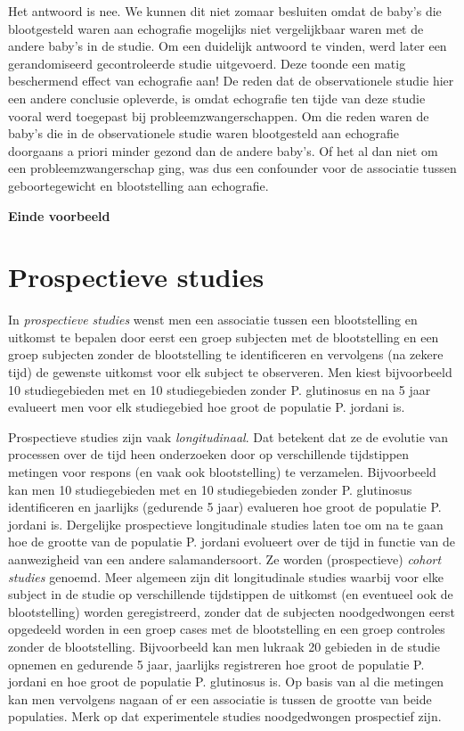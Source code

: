 \documentclass[
  12pt,dutch,coursenotes]{book}
\theoremstyle{definition}
\theoremstyle{definition}
\theoremstyle{definition}
\theoremstyle{remark}
\begin{document}
Het antwoord is nee. We kunnen dit niet zomaar besluiten omdat de baby's die blootgesteld waren aan echografie mogelijks niet vergelijkbaar waren met de andere baby's in de studie. Om een duidelijk antwoord te vinden, werd later een gerandomiseerd
gecontroleerde studie uitgevoerd. Deze toonde een matig beschermend effect
van echografie aan! De reden dat de observationele studie hier een andere
conclusie opleverde, is omdat echografie ten tijde van deze studie vooral
werd toegepast bij probleemzwangerschappen. Om die reden waren de baby's die
in de observationele studie waren blootgesteld aan echografie doorgaans a
priori minder gezond dan de andere baby's. Of het al dan niet om een
probleemzwangerschap ging, was dus een confounder voor de associatie tussen
geboortegewicht en blootstelling aan echografie.

\textbf{Einde voorbeeld}

\hypertarget{subsec:design:prosp}{%
\section{Prospectieve studies}\label{subsec:design:prosp}}

In \emph{prospectieve studies} wenst men een associatie tussen een
blootstelling en uitkomst te bepalen door eerst een groep subjecten met de
blootstelling en een groep subjecten zonder de blootstelling te
identificeren en vervolgens (na zekere tijd) de gewenste uitkomst voor elk subject
te observeren. Men kiest bijvoorbeeld 10 studiegebieden met en 10 studiegebieden zonder P. glutinosus en na 5 jaar evalueert men voor elk studiegebied hoe groot de populatie P. jordani is.

Prospectieve studies zijn vaak \emph{longitudinaal}. Dat betekent dat ze
de evolutie van processen over de tijd heen onderzoeken door op
verschillende tijdstippen metingen voor respons (en vaak ook blootstelling) te
verzamelen. Bijvoorbeeld kan men 10 studiegebieden met en 10 studiegebieden zonder P. glutinosus identificeren en jaarlijks (gedurende 5 jaar) evalueren hoe groot de populatie P. jordani is. Dergelijke prospectieve longitudinale studies laten toe om na te gaan hoe de grootte van de populatie P. jordani evolueert over de tijd in functie van de aanwezigheid van een andere salamandersoort. Ze
worden (prospectieve) \emph{cohort studies} genoemd. Meer algemeen zijn
dit longitudinale studies waarbij voor elke subject in de studie op
verschillende tijdstippen de uitkomst (en eventueel ook de blootstelling) worden geregistreerd,
zonder dat de subjecten noodgedwongen eerst opgedeeld worden in een groep
cases met de blootstelling en een groep controles zonder de blootstelling.
Bijvoorbeeld kan men lukraak 20 gebieden in de studie
opnemen en gedurende 5 jaar, jaarlijks registreren hoe groot de populatie P. jordani en hoe groot de populatie P. glutinosus is. Op
basis van al die metingen kan men vervolgens nagaan of er een associatie is
tussen de grootte van beide populaties. Merk op dat experimentele studies noodgedwongen prospectief zijn.
\end{document}
